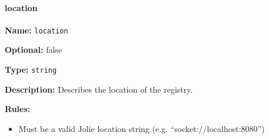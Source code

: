 \hypertarget{location}{\paragraph{location}\label{location}}

\textbf{Name:} \texttt{location}

\textbf{Optional:} false

\textbf{Type:} \texttt{string}

\textbf{Description:} Describes the location of the registry.

\textbf{Rules:}

\begin{itemize}
\tightlist
\item
  Must be a valid Jolie location string (e.g.
  ``socket://localhost:8080'')
\end{itemize}
